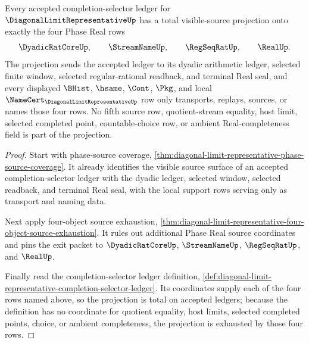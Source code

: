 \begin{theorem}
\label{thm:diagonal-limit-representative-phase-source-projection-totality}
Every accepted completion-selector ledger for $\DiagonalLimitRepresentativeUp$ has a total visible-source projection onto exactly the four Phase Real rows
$$
\DyadicRatCoreUp,\qquad \StreamNameUp,\qquad \RegSeqRatUp,\qquad \RealUp.
$$
The projection sends the accepted ledger to its dyadic arithmetic ledger, selected finite window, selected regular-rational readback, and terminal Real seal, and every displayed $\BHist$, $\hsame$, $\Cont$, $\Pkg$, and local $\NameCert_{\DiagonalLimitRepresentativeUp}$ row only transports, replays, sources, or names those four rows. No fifth source row, quotient-stream equality, host limit, selected completed point, countable-choice row, or ambient Real-completeness field is part of the projection.
\end{theorem}
\begin{proof}
Start with phase-source coverage, \autoref{thm:diagonal-limit-representative-phase-source-coverage}. It already identifies the visible source surface of an accepted completion-selector ledger with the dyadic ledger, selected window, selected readback, and terminal Real seal, with the local support rows serving only as transport and naming data.

Next apply four-object source exhaustion, \autoref{thm:diagonal-limit-representative-four-object-source-exhaustion}. It rules out additional Phase Real source coordinates and pins the exit packet to $\DyadicRatCoreUp$, $\StreamNameUp$, $\RegSeqRatUp$, and $\RealUp$.

Finally read the completion-selector ledger definition, \autoref{def:diagonal-limit-representative-completion-selector-ledger}. Its coordinates supply each of the four rows named above, so the projection is total on accepted ledgers; because the definition has no coordinate for quotient equality, host limits, selected completed points, choice, or ambient completeness, the projection is exhausted by those four rows.
\end{proof}

